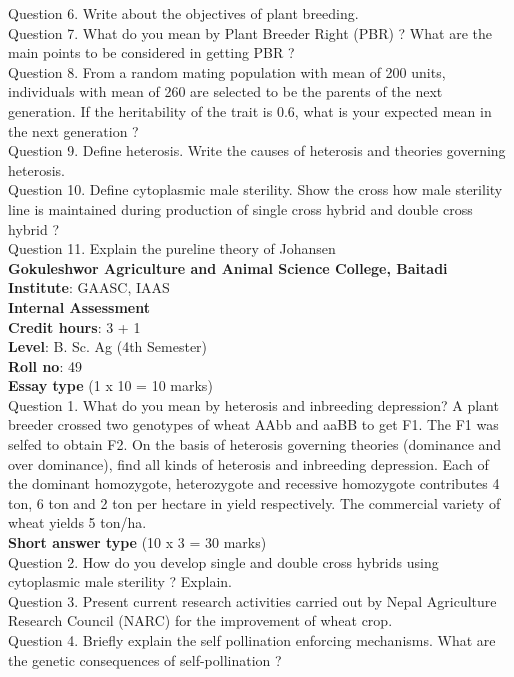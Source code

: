 \documentclass[12pt]{article}\usepackage[]{graphicx}\usepackage[]{color}
\begin{document}
Question 6. Write about the objectives of plant breeding.\\
Question 7. What do you mean by Plant Breeder Right (PBR) ? What are the main points to be considered in getting PBR ?\\
Question 8. From a random mating population with mean of 200 units, individuals with mean of 260 are selected to be the parents of the next generation. If the heritability of the trait is 0.6, what is your expected mean in the next generation ?\\
Question 9. Define heterosis. Write the causes of heterosis and theories governing heterosis.\\
Question 10. Define cytoplasmic male sterility. Show the cross how male sterility line is maintained during production of single cross hybrid and double cross hybrid ?\\
Question 11. Explain the pureline theory of Johansen\\
\clearpage 
{\centering \Large{\textbf{Gokuleshwor Agriculture and Animal Science College, Baitadi}} \\[0.25cm]
            \textbf{Institute}: GAASC, IAAS \\[0.2cm]
            \textbf{Internal Assessment} \\[0.2cm]} 
\textbf{Credit hours}: 3 + 1 \\ 
\textbf{Level}: B. Sc. Ag (4th Semester) \\
\textbf{Roll no}: 49 \\[0.5cm] 
\textbf{Essay type} (1 x 10 = 10 marks) \\
Question 1. What do you mean by heterosis and inbreeding depression? A plant breeder crossed two genotypes of wheat AAbb and aaBB to get F1. The F1 was selfed to obtain F2. On the basis of heterosis governing theories (dominance and over dominance), find all kinds of heterosis and inbreeding depression. Each of the dominant homozygote, heterozygote and recessive homozygote contributes 4 ton, 6 ton and 2 ton per hectare in yield respectively. The commercial variety of wheat yields 5 ton/ha.\\
\textbf{Short answer type} (10 x 3 = 30 marks) \\
Question 2. How do you develop single and double cross hybrids using cytoplasmic male sterility ? Explain.\\
Question 3. Present current research activities carried out by Nepal Agriculture Research Council (NARC) for the improvement of wheat crop.\\
Question 4. Briefly explain the self pollination enforcing mechanisms. What are the genetic consequences of self-pollination ?\\
\end{document}
